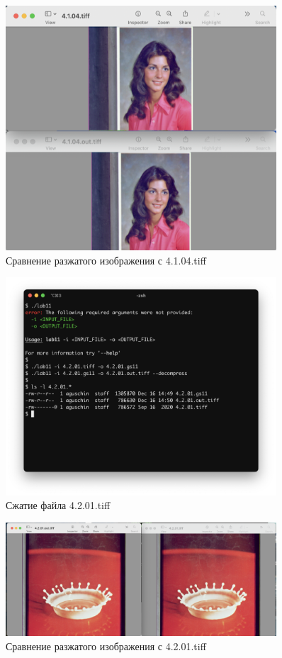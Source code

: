\documentclass[a4paper,oneside]{article}
\theoremstyle{definition}
\begin{document}
\begin{figure}[H]
  \centering
  \includegraphics[width=0.9\textwidth]{test1_img.jpg}
  \caption{Сравнение разжатого изображения с 4.1.04.tiff}
  \label{fig:test_1_img}
\end{figure}


\begin{figure}[H]
  \centering
  \includegraphics[width=0.9\textwidth]{test2.jpg}
  \caption{Сжатие файла 4.2.01.tiff}
  \label{fig:test_2}
\end{figure}

\begin{figure}[H]
  \centering
  \includegraphics[width=0.9\textwidth]{test2_img.jpg}
  \caption{Сравнение разжатого изображения с 4.2.01.tiff}
  \label{fig:test_2_img}
\end{figure}
\end{document}
